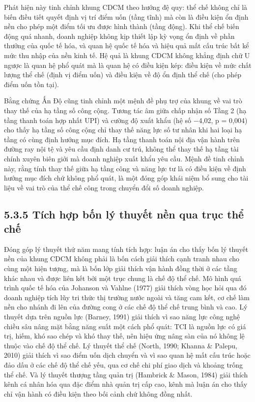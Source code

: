 \documentclass[
  a4paper,
  13pt]{extreport}
\begin{document}
Phát hiện này tinh chỉnh khung CDCM theo hướng đệ quy: thể chế không chỉ
là biến điều tiết quyết định vị trí điểm uốn (tầng tĩnh) mà còn là điều
kiện ổn định nền cho phép một điểm tối ưu được hình thành (tầng động).
Khi thể chế biến động quá nhanh, doanh nghiệp không kịp thiết lập kỳ
vọng ổn định về phần thưởng của quốc tế hóa, và quan hệ quốc tế hóa và
hiệu quả mất cấu trúc bất kể mức thu nhập của nền kinh tế. Hệ quả là
khung CDCM không khẳng định chữ U ngược là quan hệ phổ quát mà là quan
hệ có điều kiện kép: điều kiện về mức chất lượng thể chế (định vị điểm
uốn) và điều kiện về độ ổn định thể chế (cho phép điểm uốn tồn tại).

Bằng chứng Ấn Độ cũng tinh chỉnh một mệnh đề phụ trợ của khung về vai
trò thay thế của hạ tầng số công cộng. Tương tác âm giữa chấp nhận số
Tầng 2 (hạ tầng thanh toán hợp nhất UPI) và cường độ xuất khẩu (hệ số
−4,02, p = 0,004) cho thấy hạ tầng số công cộng chỉ thay thế năng lực số
tư nhân khi hai loại hạ tầng có cùng định hướng mục đích. Hạ tầng thanh
toán nội địa vận hành trên đường ray nội tệ và yêu cầu định danh cư trú,
không thể thay thế hạ tầng tài chính xuyên biên giới mà doanh nghiệp
xuất khẩu yêu cầu. Mệnh đề tinh chỉnh này, rằng tính thay thế giữa hạ
tầng công và năng lực tư là có điều kiện về định hướng mục đích chứ
không phổ quát, là một đóng góp khái niệm bổ sung cho tài liệu về vai
trò của thể chế công trong chuyển đổi số doanh nghiệp.

\hypertarget{tuxedch-hux1ee3p-bux1ed1n-luxfd-thuyux1ebft-nux1ec1n-qua-trux1ee5c-thux1ec3-chux1ebf}{%
\subsection{5.3.5 Tích hợp bốn lý thuyết nền qua trục thể
chế}\label{tuxedch-hux1ee3p-bux1ed1n-luxfd-thuyux1ebft-nux1ec1n-qua-trux1ee5c-thux1ec3-chux1ebf}}

Đóng góp lý thuyết thứ năm mang tính tích hợp: luận án cho thấy bốn lý
thuyết nền của khung CDCM không phải là bốn cách giải thích cạnh tranh
nhau cho cùng một hiện tượng, mà là bốn lớp giải thích vận hành đồng
thời ở các tầng khác nhau và được liên kết bởi một trục chung là chế độ
thể chế. Mô hình quá trình quốc tế hóa của Johanson và Vahlne (1977)
giải thích vòng học hỏi qua đó doanh nghiệp tích lũy tri thức thị trường
nước ngoài và tăng cam kết, cơ chế làm nền cho nhánh đi lên của đường
cong ở các chế độ thể chế trung bình và cao. Lý thuyết dựa trên nguồn
lực (Barney, 1991) giải thích vì sao năng lực công nghệ chiều sâu nâng
mặt bằng năng suất một cách phổ quát: TCI là nguồn lực có giá trị, hiếm,
khó sao chép và khó thay thế, nên hiệu ứng nâng sàn của nó không lệ
thuộc vào chế độ thể chế. Lý thuyết thể chế (North, 1990; Khanna \&
Palepu, 2010) giải thích vì sao điểm uốn dịch chuyển và vì sao quan hệ
mất cấu trúc hoặc đảo dấu ở các chế độ thể chế yếu, qua cơ chế chi phí
giao dịch và khoảng trống thể chế. Và lý thuyết thượng tầng quản trị
(Hambrick \& Mason, 1984) giải thích kênh cá nhân hóa qua đặc điểm nhà
quản trị cấp cao, kênh mà luận án cho thấy chỉ vận hành có điều kiện
theo bối cảnh chứ không đồng nhất.
\end{document}

